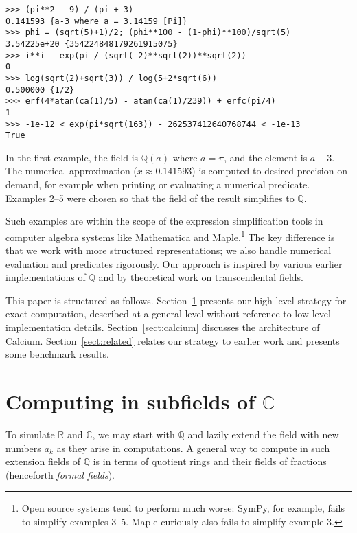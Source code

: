 \documentclass[11pt,a4paper]{article}
\begin{document}
\begin{small}
\begin{verbatim}
>>> (pi**2 - 9) / (pi + 3)
0.141593 {a-3 where a = 3.14159 [Pi]}
>>> phi = (sqrt(5)+1)/2; (phi**100 - (1-phi)**100)/sqrt(5)
3.54225e+20 {354224848179261915075}
>>> i**i - exp(pi / (sqrt(-2)**sqrt(2))**sqrt(2))
0
>>> log(sqrt(2)+sqrt(3)) / log(5+2*sqrt(6))
0.500000 {1/2}
>>> erf(4*atan(ca(1)/5) - atan(ca(1)/239)) + erfc(pi/4)
1
>>> -1e-12 < exp(pi*sqrt(163)) - 262537412640768744 < -1e-13
True
\end{verbatim}
\end{small}


In the first example, the field is $\mathbb{Q}(a)$ where $a = \pi$,
and the element is $a-3$.
The numerical approximation ($x \approx 0.141593$) is computed to
desired precision on demand, for example when printing
or evaluating a numerical predicate.
Examples 2--5 were chosen so that the field
of the result simplifies to $\mathbb{Q}$.

Such examples are within the scope of the
expression simplification tools in computer algebra systems like
Mathematica and Maple.\footnote{Open source systems
tend to perform much worse: SymPy, for example,
fails to simplify examples 3--5. Maple curiously also fails to simplify example 3.}
The key difference is that we
work with more structured representations;
we also handle numerical evaluation and predicates rigorously.
Our approach is inspired by
various earlier implementations of $\overline{\mathbb{Q}}$
and by theoretical work on transcendental fields.

This paper is structured as follows. Section~\ref{sect:algebraic}
presents our high-level strategy for exact computation, described at a general level
without reference to low-level implementation details.
Section~\ref{sect:calcium} discusses the architecture of Calcium.
Section~\ref{sect:related} relates our strategy
to earlier work and presents some benchmark results.

\section{Computing in subfields of $\mathbb{C}$}

\label{sect:algebraic}

To simulate $\mathbb{R}$ and $\mathbb{C}$,
we may start with $\mathbb{Q}$ and
lazily extend the field with new numbers $a_k$ as they arise
in computations.
A general way to compute in such extension fields of $\mathbb{Q}$
is in terms of quotient rings
and their fields of fractions (henceforth \emph{formal fields}).
\end{document}
